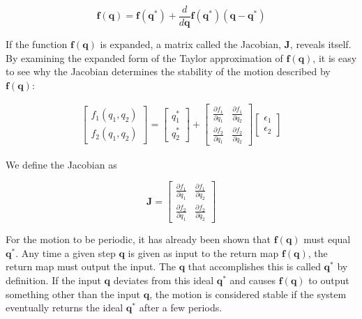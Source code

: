 \begin{equation}
    \mathbf{f} ( \mathbf{q} ) = \mathbf{f} ( \mathbf{q}^{*} ) +
    \frac{d}{d\mathbf{q}}\mathbf{f} (\mathbf{q}^{*}) ( \mathbf{q}
    - \mathbf{q}^{*} )
\label{eq:LinearShorthand}
\end{equation}

If the function $\mathbf{f}(\mathbf{q})$ is expanded, a matrix called the
Jacobian, $\mathbf{J}$, reveals itself. By examining the expanded form of the
Taylor approximation of $\mathbf{f}(\mathbf{q})$, it is easy to see why the
Jacobian determines the stability of the motion described by
$\mathbf{f}(\mathbf{q})$:

\begin{align}
\begin{bmatrix}
f_{1} (q_{1},q_{2}) \\
f_{2} (q_{1},q_{2}) 
\end{bmatrix}
=
\begin{bmatrix}
q_{1}^{*} \\
q_{2}^{*}
\end{bmatrix}
+
\begin{bmatrix}
\displaystyle\frac{\partial f_{1}}{\partial q_{1}} &  \displaystyle\frac{\partial f_{1}}{\partial q_{2}} \\
\displaystyle \frac{\partial f_{2}}{\partial q_{1}} & \displaystyle \frac{\partial f_{2}}{\partial q_{2}}
\end{bmatrix}
\begin{bmatrix}
\epsilon_{1} \\
\epsilon_{2}
\end{bmatrix}
\label{eq:LinearLonghand}
\end{align}

We define the Jacobian as

\begin{equation}
    \mathbf{J} = 
\begin{bmatrix}
\displaystyle\frac{\partial f_{1}}{\partial q_{1}} &  \displaystyle\frac{\partial f_{1}}{\partial q_{2}} \\
\displaystyle \frac{\partial f_{2}}{\partial q_{1}} & \displaystyle \frac{\partial f_{2}}{\partial q_{2}}
\end{bmatrix}
\label{eq:Jacobian}
\end{equation}



For the motion to be periodic, it has already been shown that
$\mathbf{f}(\mathbf{q})$ must equal $\mathbf{q}^{*}$. Any time a given step
$\mathbf{q}$ is given as input to the return map $\mathbf{f}(\mathbf{q})$, the
return map must output the input.  The $\mathbf{q}$ that accomplishes this is
called $\mathbf{q}^{*}$ by definition. If the input $\mathbf{q}$ deviates from
this ideal $\mathbf{q}^{*}$ and causes $\mathbf{f}(\mathbf{q})$ to output
something other than the input $\mathbf{q}$, the motion is considered stable if
the system eventually returns the ideal $\mathbf{q}^{*}$ after a few periods.

